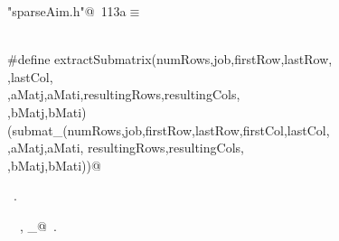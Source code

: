 \documentclass{article}
\begin{document}
\begin{description}
\begin{flushleft}
\end{flushleft}
\item[extract submatrix]
\begin{flushleft} \small
\begin{minipage}{\linewidth}\label{scrap200}\raggedright\small
{} \verb@"sparseAim.h"@\nobreak\ {\footnotesize {113a}}$\equiv$
\vspace{-1ex}
\begin{list}{}{} \item
\mbox{}\verb@@\\
\mbox{}\verb@#define extractSubmatrix(numRows,job,firstRow,lastRow, \@\\
\mbox{}\verb@firstCol,lastCol, \@\\
\mbox{}\verb@aMat,aMatj,aMati,resultingRows,resultingCols, \@\\
\mbox{}\verb@bMat,bMatj,bMati) \@\\
\mbox{}\verb@(submat_(numRows,job,firstRow,lastRow,firstCol,lastCol, \@\\
\mbox{}\verb@aMat,aMatj,aMati, resultingRows,resultingCols,\@\\
\mbox{}\verb@bMat,bMatj,bMati))@\\
\mbox{}\verb@@{\NWsep}
\end{list}
\vspace{-1.5ex}
\footnotesize
\begin{list}{}{\setlength{\itemsep}{-\parsep}\setlength{\itemindent}{-\leftmargin}}
\item \NWtxtFileDefBy\ .
\item \NWtxtIdentsUsed\nobreak\  \verb@job@\nobreak\ , \verb@submat_@\nobreak\ .
\item{}
\end{list}
\end{minipage}\vspace{4ex}
\end{flushleft}
\item[ in place transpose ]

\end{description}
\end{document}
